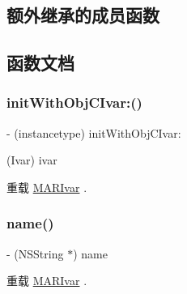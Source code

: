 \subsection*{额外继承的成员函数}


\subsection{函数文档}
\mbox{\label{interface___m_a_r_obj_c_ivar_ac3cd7d9e7fe7a418d46bd4d9e216e351}} 
\subsubsection{\texorpdfstring{init\+With\+Obj\+C\+Ivar\+:()}{initWithObjCIvar:()}}
{\footnotesize\ttfamily -\/ (instancetype) init\+With\+Obj\+C\+Ivar\+: \begin{DoxyParamCaption}\item[{(Ivar)}]{ivar }\end{DoxyParamCaption}\hspace{0.3cm}{\ttfamily [implementation]}}



重载 \hyperlink{interface_m_a_r_ivar_ae9ab588059c47c23a19de406155c3e70}{M\+A\+R\+Ivar} .

\mbox{\label{interface___m_a_r_obj_c_ivar_a43dde43f4f9f5a541d420d49948e55c4}} 
\subsubsection{\texorpdfstring{name()}{name()}}
{\footnotesize\ttfamily -\/ (N\+S\+String $\ast$) name \begin{DoxyParamCaption}{ }\end{DoxyParamCaption}\hspace{0.3cm}{\ttfamily [implementation]}}



重载 \hyperlink{interface_m_a_r_ivar_a9bb452e4b5f0d1517f4e6b2c9f328af7}{M\+A\+R\+Ivar} .

